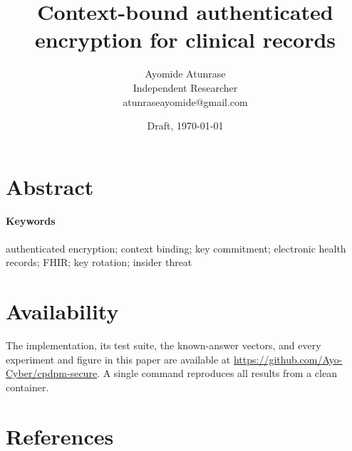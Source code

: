 \documentclass{article}
\title{Context-bound authenticated encryption for clinical records}
\author{Ayomide Atunrase \\ Independent Researcher \\ atunraseayomide@gmail.com}
\date{Draft, \today}
\begin{document}
\maketitle
\section*{Abstract}

\paragraph{Keywords} authenticated encryption; context binding; key commitment; electronic health records; FHIR; key rotation; insider threat







\section*{Availability}
The implementation, its test suite, the known-answer vectors, and every experiment and figure in this paper are available at \url{https://github.com/Ayo-Cyber/cpdpm-secure}. A single command reproduces all results from a clean container.
\section*{References}
\end{document}
